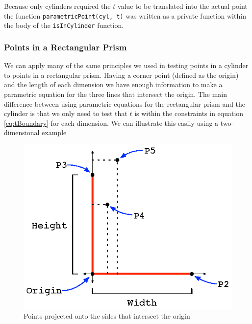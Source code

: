 \documentclass[authoryearcitations]{UoYCSproject}
\begin{document}
Because only cylinders required the $t$ value to be translated into the actual point the function 
\verb+parametricPoint(cyl, t)+ was written as a private function within the body of the \verb+isInCylinder+
function.

\subsubsection{Points in a Rectangular Prism}
We can apply many of the same principles we used in testing points in a cylinder to points in a rectangular prism.
Having a corner point (defined as the origin) and the length of each dimension we have enough information to make a
parametric equation for the three lines that intersect the origin. The main difference between using parametric 
equations for the rectangular prism and the cylinder is that we only need to test that $t$ is within the constraints 
in equation \ref{eq:tBoundary} for each dimension. We can illustrate this easily using a two-dimensional example

\begin{figure}[h!]
  \centering
  \includegraphics[scale=1.2]{figures/recPrism.eps}
  \caption{Points projected onto the sides that intersect the origin}
\label{recPrism}
\end{figure}
\end{document}
